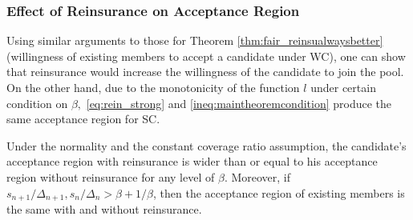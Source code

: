 \documentclass[fleqn,mnsc,nonblindrev]{informs4}
\begin{document}
\subsubsection*{Effect of Reinsurance on Acceptance Region}\label{sec:changeinaccept}
Using similar arguments to those for Theorem \ref{thm:fair_reinsualwaysbetter} (willingness of existing members to accept a candidate under WC), one can show that reinsurance would increase the willingness of the candidate to join the pool.   {On the other hand, due to the monotonicity of the function $l$ under certain condition on $\beta,$ \eqref{eq:rein_strong} and \eqref{ineq:maintheoremcondition} produce the same acceptance region for SC.}
\begin{theorem}\label{thm:acceptchange_candidate}
Under the normality and the constant coverage ratio assumption, the candidate's acceptance region with reinsurance is wider than or equal to his acceptance region without reinsurance   {for any level of $\beta$. Moreover, if $s_{n+1}/\Delta_{n+1}, s_{n}/\Delta_{n}>  {\beta+1/\beta}$,} then the acceptance region of existing members is the same with and without reinsurance.
\end{theorem}
\end{document}
